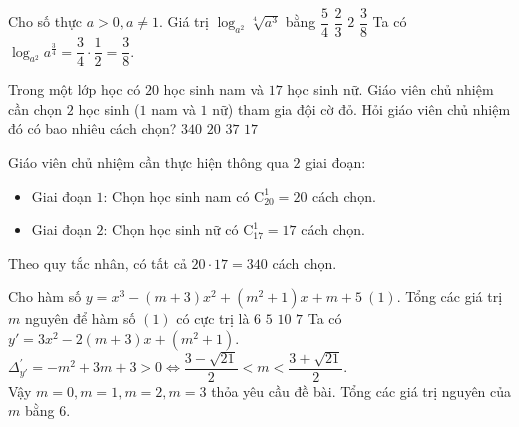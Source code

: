 		\begin{ex}%
			Cho số thực $a>0,a \ne 1$. Giá trị $\log_{a^2} \sqrt[4]{a^3}$ bằng
			\choice
			{$\dfrac{5}{4}$}
			{$\dfrac{2}{3}$}
			{$2$}
			{\True $\dfrac{3}{8}$}
			\loigiai
			{
				Ta có $\log_{a^2} a^{\frac{3}{4}} = \dfrac{3}{4} \cdot \dfrac{1}{2} = \dfrac{3}{8}$.
			}
		\end{ex}
		
		\begin{ex}%
			Trong một lớp học có $20$ học sinh nam và $17$ học sinh nữ. Giáo viên chủ nhiệm cần chọn $2$ học sinh ($1$ nam và $1$ nữ) tham gia đội cờ đỏ. Hỏi giáo viên chủ nhiệm đó có bao nhiêu cách chọn?
			\choice
			{\True $340$}
			{$20$}
			{$37$}
			{$17$}
			\loigiai
			{
				Giáo viên chủ nhiệm cần thực hiện thông qua $2$ giai đoạn:
				\begin{itemize}
					\item Giai đoạn $1$: Chọn học sinh nam có $\mathrm{C}_{20}^1 = 20$ cách chọn.
					\item Giai đoạn $2$: Chọn học sinh nữ có $\mathrm{C}_{17}^1 = 17$ cách chọn.
				\end{itemize}
				Theo quy tắc nhân, có tất cả $20 \cdot 17 = 340$ cách chọn.
			}
		\end{ex}
		
		\begin{ex}%
			Cho hàm số $y = x^3 - (m+3)x^2 + \left(m^2 + 1\right)x + m+ 5~(1)$. Tổng các giá trị $m$ nguyên để  hàm số $(1)$ có cực trị là 
			\choice
			{\True $6$}
			{$5$}
			{$10$}
			{$7$}
			\loigiai
			{
				Ta có $y'=3x^2-2\left(m+3\right)x+\left(m^2+1\right)$. \\
			$\Delta_{y'}^{'} =-m^2+3m+3>0 \Leftrightarrow \dfrac{3-\sqrt{21}}{2}<m<\dfrac{3+\sqrt{21}}{2}$. \\
			Vậy $m=0,m=1,m=2,m=3$ thỏa yêu cầu đề bài. Tổng các giá trị nguyên của $m$ bằng $6$.
			}
		\end{ex}
		
